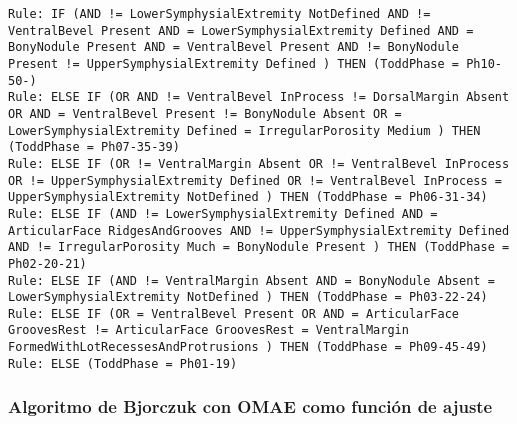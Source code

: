 \begin{lstlisting}
Rule: IF (AND != LowerSymphysialExtremity NotDefined AND != VentralBevel Present AND = LowerSymphysialExtremity Defined AND = BonyNodule Present AND = VentralBevel Present AND != BonyNodule Present != UpperSymphysialExtremity Defined ) THEN (ToddPhase = Ph10-50-)
Rule: ELSE IF (OR AND != VentralBevel InProcess != DorsalMargin Absent OR AND = VentralBevel Present != BonyNodule Absent OR = LowerSymphysialExtremity Defined = IrregularPorosity Medium ) THEN (ToddPhase = Ph07-35-39)
Rule: ELSE IF (OR != VentralMargin Absent OR != VentralBevel InProcess OR != UpperSymphysialExtremity Defined OR != VentralBevel InProcess = UpperSymphysialExtremity NotDefined ) THEN (ToddPhase = Ph06-31-34)
Rule: ELSE IF (AND != LowerSymphysialExtremity Defined AND = ArticularFace RidgesAndGrooves AND != UpperSymphysialExtremity Defined AND != IrregularPorosity Much = BonyNodule Present ) THEN (ToddPhase = Ph02-20-21)
Rule: ELSE IF (AND != VentralMargin Absent AND = BonyNodule Absent = LowerSymphysialExtremity NotDefined ) THEN (ToddPhase = Ph03-22-24)
Rule: ELSE IF (OR = VentralBevel Present OR AND = ArticularFace GroovesRest != ArticularFace GroovesRest = VentralMargin FormedWithLotRecessesAndProtrusions ) THEN (ToddPhase = Ph09-45-49)
Rule: ELSE (ToddPhase = Ph01-19)
\end{lstlisting}


\subsubsection{Algoritmo de Bjorczuk con OMAE como función de ajuste}

